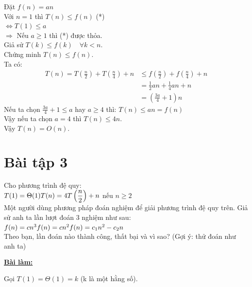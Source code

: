 \documentclass[12pt, a4paper, fleqn]{article}
\begin{document}
		Đặt $f(n) = an$\\
		Với $n = 1$ thì $T(n) \leq f(n)$ \hspace{100pt} (*)\\
		$\Leftrightarrow  T(1) \leq a$\\
		$\Rightarrow$ Nếu $a \geq 1$ thì (*) được thỏa.\\
		Giả sử $T(k) \leq f(k) \quad \forall k < n$.\\
		Chứng minh $T(n) \leq f(n)$.\\
		Ta có:\
		\begin{align*}
		T(n) = T\left( \frac{n}{2} \right) + T\left( \frac{n}{4} \right) + n &\leq f\left( \frac{n}{2}\right) + f\left( \frac{n}{4}\right) + n\\
		&= \frac{1}{2} an + \frac{1}{4} an + n\\
		&= \left( \frac{3a}{4} + 1 \right) n
		\end{align*}
		Nếu ta chọn $\displaystyle \frac{3a}{4} + 1 \leq a$ hay $a \geq 4$ thì: $T(n) \leq an = f(n)$\\
		Vậy nếu ta chọn $a = 4$ thì $T(n) \leq 4n$.\\
		Vậy $T(n) = O(n)$.
	
	
	\clearpage
	
	\section*{Bài tập 3}
		Cho phương trình đệ quy:\\
		$\displaystyle
		T(1) = \Theta (1)\\
		T(n) = 4T\left( \frac{n}{2} \right) + n$ nếu $n \geq 2$\\
		Một người dùng phương pháp đoán nghiệm để giải phương trình đệ quy trên. Giả sử anh ta lần lượt đoán 3 nghiệm như sau:\\
		$f(n) = cn^3\\
		f(n) = cn^2\\
		f(n) = c_1n^2 - c_2n$\\
		Theo bạn, lần đoán nào thành công, thất bại và vì sao? (Gợi ý: thử đoán như anh ta)
		
		\begin{center}
			\textbf{\underline{Bài làm:}}
		\end{center}
	
		Gọi $T(1) = \Theta (1) = k$ (k là một hằng số).\\
		
\end{document}
